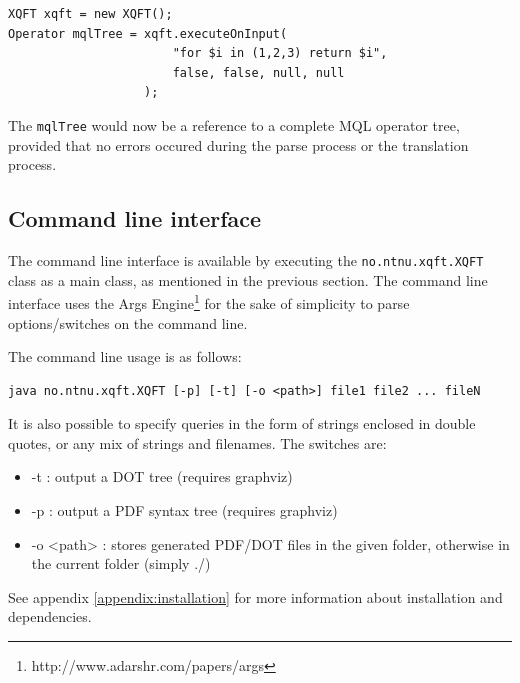 \begin{Verbatim}
XQFT xqft = new XQFT();
Operator mqlTree = xqft.executeOnInput(
                       "for $i in (1,2,3) return $i", 
                       false, false, null, null
                   );
\end{Verbatim}

The \texttt{mqlTree} would now be a reference to a complete MQL operator tree,
provided that no errors occured during the parse process or the translation
process.

\subsection{Command line interface}
The command line interface is available by executing the
\texttt{no.ntnu.xqft.XQFT} class as a main class, as mentioned in the previous
section. The command line interface uses the Args
Engine\footnote{http://www.adarshr.com/papers/args} for the sake of simplicity
to parse options/switches on the command line. 

The command line usage is as follows:

\begin{Verbatim}
java no.ntnu.xqft.XQFT [-p] [-t] [-o <path>] file1 file2 ... fileN
\end{Verbatim}

It is also possible to specify queries in the form of strings enclosed in
double quotes, or any mix of strings and filenames. The switches are:
\begin{itemize}
  \item -t : output a DOT tree (requires graphviz)
  \item -p : output a PDF syntax tree (requires graphviz)
  \item -o <path> : stores generated PDF/DOT files in the given folder, 
  otherwise in the current folder (simply ./)
\end{itemize}

See appendix \ref{appendix:installation} for more information about installation and
dependencies.

